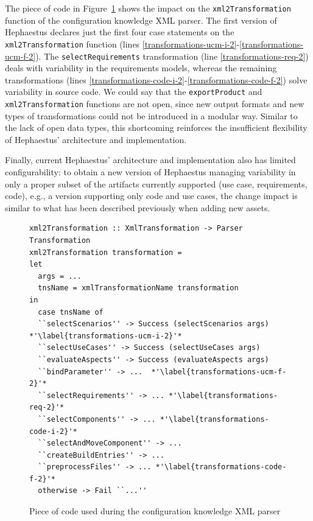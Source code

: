 The piece of code in Figure~\ref{fig:xml-transformation-parser} shows the impact on the \texttt{xml2Transformation} function of the configuration knowledge XML parser. The first version of Hephaestus declares just the
first four case statements on the \texttt{xml2Transformation}
function (lines  \ref{transformations-ucm-i-2}-\ref{transformations-ucm-f-2}). The
\texttt{selectRequirements} transformation (line \ref{transformations-req-2}) deals with variability in the requirements models,
whereas the remaining transformations (lines \ref{transformations-code-i-2}-\ref{transformations-code-f-2}) solve
variability in source code. We could say that the \texttt{exportProduct}
and \texttt{xml2Transformation} functions are not open, since new output formats and
new types of transformations could not be introduced in a modular way. Similar to the lack of open data types, this shortcoming reinforces the insufficient flexibility of Hephaestus' architecture and implementation.

Finally, current Hephaestus' architecture and implementation also has limited configurability: to obtain a new version of Hephaestus managing variability in only a proper subset of the artifacts currently supported (use case, requirements, code), e.g., a version supporting only code and use cases, the change impact is similar to what has been described previously when adding new assets.

\begin{figure}
\begin{lstlisting}
xml2Transformation :: XmlTransformation -> Parser Transformation
xml2Transformation transformation =
let
  args = ...
  tnsName = xmlTransformationName transformation
in
  case tnsName of
  ``selectScenarios'' -> Success (selectScenarios args) *'\label{transformations-ucm-i-2}'*
  ``selectUseCases'' -> Success (selectUseCases args)
  ``evaluateAspects'' -> Success (evaluateAspects args)
  ``bindParameter'' -> ...  *'\label{transformations-ucm-f-2}'*
  ``selectRequirements'' -> ... *'\label{transformations-req-2}'*
  ``selectComponents'' -> ... *'\label{transformations-code-i-2}'*
  ``selectAndMoveComponent'' -> ...
  ``createBuildEntries'' -> ...
  ``preprocessFiles'' -> ... *'\label{transformations-code-f-2}'*
  otherwise -> Fail ``...''
\end{lstlisting}
\caption{Piece of code used during the configuration knowledge XML parser}
\label{fig:xml-transformation-parser}
\end{figure}
